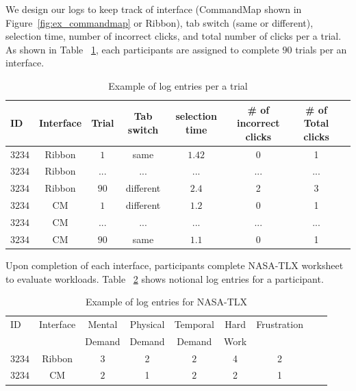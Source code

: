\documentclass{article}
\begin{document}
 We design our logs to keep track of interface (CommandMap shown in Figure~\ref{fig:ex_commandmap} or Ribbon), tab switch (same or different),  selection time, number of incorrect clicks, and total number of clicks per a trial. As shown in Table ~\ref{fig:trial_log}, each participants are assigned to complete $90$ trials per an interface. 
 \begin{table}[tbh]
  \centering
\begin{tabular}{|l|c|c|c|c|c|c|c|}
  \hline
 ID &  Interface  &  Trial &  Tab switch & selection time & \# of incorrect clicks & \# of Total clicks              \\\hline
 $3234$ &   Ribbon  & $1$  & same  & $1.42$ & 0  &1 \\ \hline
$3234$  &    Ribbon &   $...$ & ...  & ... &  ... & ...\\\hline       
$3234$  &    Ribbon &   $90$ & different  & $2.4$ &2  &3 \\\hline      
$3234$  &    CM &   $1$ & different  & $1.2$ & 0 & 1 \\\hline   
$3234$  &    CM &   $...$ & ...  & ... &  ... & ...\\\hline   
$3234$  &    CM &   $90$ & same  & $1.1$ & 0 & 1 \\\hline  
\end{tabular}
\caption{Example of log entries per a trial}
\label{fig:trial_log}
\end{table}

Upon completion of each interface, participants complete NASA-TLX worksheet to evaluate workloads. Table ~\ref{fig:nasa_log} shows notional log entries for a participant. 
\begin{table}[tbh]
  \centering
\begin{tabular}{|l|c|c|c|c|c|c|c|c|}
  \hline
  ID &  Interface  & Mental 	&  Physical 	 &Temporal  	& Hard  & Frustration      \\      
       &                  & Demand	& Demand 	& Demand 	& Work		     &			\\\hline
$3234$ &   Ribbon  & $3$  & 2  & $2$ & 4  &2  \\ \hline
$3234$  &    CM &   $2$ & 1  & $2$ & 2 &1  \\\hline       
\end{tabular}
\caption{Example of log entries for NASA-TLX}
\label{fig:nasa_log}
\end{table}
\end{document}
